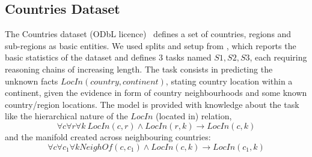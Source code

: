\documentclass[journal]{IEEEtran}
\begin{document}
\begin{table*}[th]
{\begin{tabular}{l|l|cccccccc}
\end{tabular}
}
\label{tab:nations_kinship_umls_dataset}
\end{table*}

\subsection{Countries Dataset}
\label{sec:countries}
The Countries dataset (ODbL licence)~\cite{bouchard2015approximate}
defines a set of countries, regions and sub-regions as basic entities. We used splits and setup from \cite{rocktaschel2017end}, which reports the basic statistics of the dataset and defines $3$ tasks named $S1,S2,S3$, each requiring reasoning chains of increasing length. 
The task consists in predicting the unknown facts $LocIn(country, continent)$, stating country location within a continent, given the evidence in form of country neighbourhoods and some known country/region locations.
The model is provided with knowledge about the task like the hierarchical nature of the $LocIn$ (located in) relation,
\begin{equation}
\forall c \forall r \forall k\  LocIn(c,r) \land LocIn(r,k) \rightarrow LocIn(c,k)
\label{eq:country1}
\end{equation}
and the manifold created across neighbouring countries:
\begin{equation}
\forall c \forall c_1 \!\forall k NeighOf(c, c_1) \!\land\! LocIn(c,k) \!\rightarrow\! LocIn(c_1,k) 
\label{eq:country2}
\end{equation}
    
\end{document}
